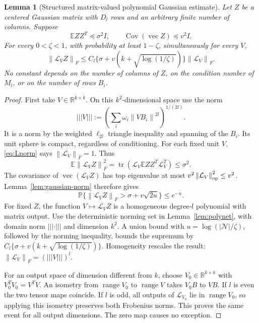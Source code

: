 \documentclass[11pt]{article}
\newtheorem{lemma}[theorem]{Lemma}
\theoremstyle{remark}\newtheorem{remark}[theorem]{Remark}
\newcommand{\R}{\mathbb R}\newcommand{\E}{\mathbb E}\newcommand{\Prob}{\mathbb P}
\newcommand{\tr}{\operatorname{tr}}\newcommand{\rank}{\operatorname{rank}}
\newcommand{\norm}[1]{\left\|#1\right\|}\newcommand{\ip}[2]{\left\langle #1,#2\right\rangle}
\newcommand{\vertiii}[1]{\left|\!\left|\!\left|#1\right|\!\right|\!\right|}
\begin{document}
\begin{lemma}[Structured matrix-valued polynomial Gaussian estimate]\label{lem:structured}
Let $Z$ be a centered Gaussian matrix with $D_l$ rows and an arbitrary finite number of columns. Suppose
\[
 \E ZZ^T\preceq \sigma^2 I,\qquad
 \operatorname{Cov}(\operatorname{vec} Z)\preceq v^2 I.
\]
For every $0<\zeta<1$, with probability at least $1-\zeta$, simultaneously for every $V$,
\begin{equation}\label{eq:structured}
 \norm{\mathcal L_VZ}_F
 \le C_l\{\sigma+v(k+\sqrt{\log(1/\zeta)})\}\norm{\mathcal L_V}_F.
\end{equation}
No constant depends on the number of columns of $Z$, on the condition number of $M_l$, or on the number of rows $B_i$.
\end{lemma}
\begin{proof}
First take $V\in\R^{k\times k}$. On this $k^2$-dimensional space use the norm
\[
 \vertiii V:=\left(\sum_i\omega_i\norm{VB_i}^{2l}\right)^{1/(2l)}.
\]
It is a norm by the weighted $\ell_{2l}$ triangle inequality and spanning of the $B_i$. Its unit sphere is compact, regardless of conditioning. For each fixed unit $V$, \eqref{eq:Lnorm} says $\norm{\mathcal L_V}_F=1$. Thus
\[
 \E\norm{\mathcal L_VZ}_F^2
 =\tr(\mathcal L_V\E ZZ^T\mathcal L_V^T)\le\sigma^2.
\]
The covariance of $\operatorname{vec}(\mathcal L_VZ)$ has top eigenvalue at most
$v^2\norm{\mathcal L_V}_{\op}^2\le v^2$. Lemma~\ref{lem:gaussian-norm} therefore gives
\[
 \Prob\{\norm{\mathcal L_VZ}_F>\sigma+v\sqrt{2u}\}\le e^{-u}.
\]
For fixed $Z$, the function $V\mapsto\mathcal L_VZ$ is a homogeneous degree-$l$ polynomial with matrix output. Use the deterministic norming set in Lemma~\ref{lem:polynet}, with domain norm $\vertiii\cdot$ and dimension $k^2$. A union bound with $u=\log(|\mathcal N|/\zeta)$, followed by the norming inequality, bounds the supremum by
$C_l\{\sigma+v(k+\sqrt{\log(1/\zeta)})\}$. Homogeneity rescales the result: $\norm{\mathcal L_V}_F=(\vertiii V)^l$.

For an output space of dimension different from $k$, choose $V_0\in\R^{k\times k}$ with $V_0^TV_0=V^TV$. An isometry from $\operatorname{range}V_0$ to $\operatorname{range}V$ takes $V_0B$ to $VB$. If $l$ is even the two tensor maps coincide. If $l$ is odd, all outputs of $\mathcal L_{V_0}$ lie in $\operatorname{range}V_0$, so applying this isometry preserves both Frobenius norms. This proves the same event for all output dimensions. The zero map causes no exception.
\end{proof}
\end{document}
